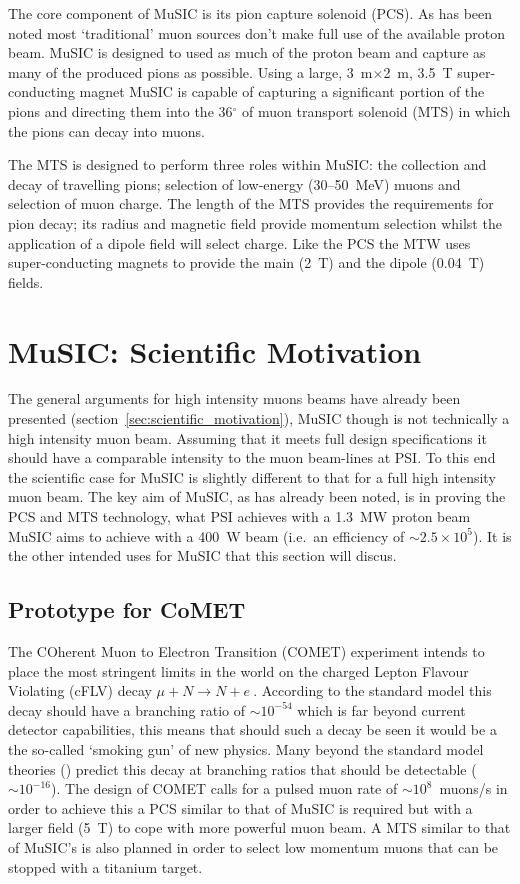 The core component of MuSIC is its pion capture solenoid (PCS). As has been noted most `traditional' muon sources don't make full use of the available proton beam. MuSIC is designed to used as much of the proton beam and capture as many of the produced pions as possible. Using a large, 3~m\( \times \)2~m, 3.5~T super-conducting magnet MuSIC is capable of capturing a significant portion of the pions and directing them into the 36\(^{\circ}\) of muon transport solenoid (MTS) in which the pions can decay into muons. 

The MTS is designed to perform three roles within MuSIC: the collection and decay of travelling pions; selection of low-energy (30--50~MeV) muons and selection of muon charge. The length of the MTS provides the requirements for pion decay; its radius and magnetic field provide momentum selection whilst the application of a dipole field will select charge. Like the PCS the MTW uses super-conducting magnets to provide the main (2~T) and the dipole (0.04~T) fields. 

\section{MuSIC: Scientific Motivation} %
\label{sec:music_scientific_motivation}
The general arguments for high intensity muons beams have already been presented (section~\ref{sec:scientific_motivation}), MuSIC though is not technically a high intensity muon beam. Assuming that it meets full design specifications it should have a comparable intensity to the muon beam-lines at PSI. To this end the scientific case for MuSIC is slightly different to that for a full high intensity muon beam. The key aim of MuSIC, as has already been noted, is in proving the PCS and MTS technology, what PSI achieves with a 1.3~MW proton beam MuSIC aims to achieve with a 400~W beam (i.e.\ an efficiency of \(\sim2.5\times10^{5}\)). It is the other intended uses for MuSIC that this section will discus.

\subsection{Prototype for CoMET} %
\label{sub:prototype_for_comet}
The COherent Muon to Electron Transition (COMET) experiment intends to place the most stringent limits in the world on the charged Lepton Flavour Violating (cFLV) decay \( \mu + N \rightarrow N + e\ \). According to the standard model this decay should have a branching ratio of \( \sim 10^{-54} \) which is far beyond current detector capabilities, this means that should such a decay be seen it would be a the so-called `smoking gun' of new physics. Many beyond the standard model theories (\cite{CITATIONS for BSM mu decay stuff}) predict this decay at branching ratios that should be detectable (\(\sim 10^{-16}\)). The design of COMET calls for a pulsed muon rate of \( \sim 10^8 \)~muons/s in order to achieve this a PCS similar to that of MuSIC is required but with a larger field (5~T) to cope with more powerful muon beam. A MTS similar to that of MuSIC's is also planned in order to select low momentum muons that can be stopped with a titanium target.

